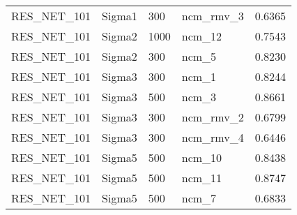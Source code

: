 \begin{longtable}{|l|l|l|l|c|}
RES\_NET\_101 & Sigma1 & 300 & ncm\_rmv\_3 & 0.6365 \\
RES\_NET\_101 & Sigma2 & 1000 & ncm\_12 & 0.7543 \\
RES\_NET\_101 & Sigma2 & 300 & ncm\_5 & 0.8230 \\
RES\_NET\_101 & Sigma3 & 300 & ncm\_1 & 0.8244 \\
RES\_NET\_101 & Sigma3 & 500 & ncm\_3 & 0.8661 \\
RES\_NET\_101 & Sigma3 & 300 & ncm\_rmv\_2 & 0.6799 \\
RES\_NET\_101 & Sigma3 & 300 & ncm\_rmv\_4 & 0.6446 \\
RES\_NET\_101 & Sigma5 & 500 & ncm\_10 & 0.8438 \\
RES\_NET\_101 & Sigma5 & 500 & ncm\_11 & 0.8747 \\
RES\_NET\_101 & Sigma5 & 500 & ncm\_7 & 0.6833 \\
\end{longtable}
